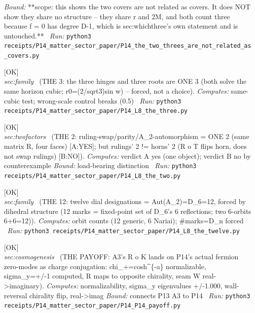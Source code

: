 \begin{description}
 \emph{Bound:} **scope: this shows the two covers are not related as covers. It does NOT show they share no structure -- they share r and 2M, and both count three because f = 0 has degree D-1, which is sec:whichthree's own statement and is untouched.**
\ \emph{Run:} \texttt{python3 receipts/P14\_matter\_sector\_paper/P14\_the\_two\_threes\_are\_not\_related\_as\_covers.py}
\item[\label{rcpt:P14_L8_the_three}\texttt{P14\_L8\_the\_three}]\hfill\textsf{[OK]}\\
\textit{sec:family} \ (THE 3: the three hinges and three roots are ONE 3 (both solve the same horizon cubic; r0=(2/sqrt3)sin w) -- forced, not a choice). 
\emph{Computes:} same-cubic test; wrong-scale control breaks (0.5)
\ \emph{Run:} \texttt{python3 receipts/P14\_matter\_sector\_paper/P14\_L8\_the\_three.py}
\item[\label{rcpt:P14_L8_the_two}\texttt{P14\_L8\_the\_two}]\hfill\textsf{[OK]}\\
\textit{sec:twofactors} \ (THE 2: ruling-swap/parity/A\_2-automorphism = ONE 2 (same matrix R, four faces) [A:YES]; but rulings' 2 != horns' 2 (R o T flips horn, does not swap rulings) [B:NO]). 
\emph{Computes:} verdict A yes (one object); verdict B no by counterexample
 \emph{Bound:} load-bearing distinction
\ \emph{Run:} \texttt{python3 receipts/P14\_matter\_sector\_paper/P14\_L8\_the\_two.py}
\item[\label{rcpt:P14_L8_the_twelve}\texttt{P14\_L8\_the\_twelve}]\hfill\textsf{[OK]}\\
\textit{sec:family} \ (THE 12: twelve dial designations = \textbar{}Aut(A\_2)\textbar{}=\textbar{}D\_6\textbar{}=12, forced by dihedral structure (12 marks = fixed-point set of D\_6's 6 reflections; two 6-orbits 6+6=12)). 
\emph{Computes:} orbit counts (12 generic, 6 Nariai); \#marks=\textbar{}D\_n\textbar{} forced
\ \emph{Run:} \texttt{python3 receipts/P14\_matter\_sector\_paper/P14\_L8\_the\_twelve.py}
\item[\label{rcpt:P14_P14_payoff}\texttt{P14\_P14\_payoff}]\hfill\textsf{[OK]}\\
\textit{sec:cosmogenesis} \ (THE PAYOFF: A3's R o K lands on P14's actual fermion zero-modes as charge conjugation: chi\_+=cosh\textasciicircum{}\{-a\} normalizable, sigma\_y=+/-1 computed, R maps to opposite chirality, seam W real->imaginary). 
\emph{Computes:} normalizability, sigma\_y eigenvalues +/-1.000, wall-reversal chirality flip, real->imag
 \emph{Bound:} connects P13 A3 to P14
\ \emph{Run:} \texttt{python3 receipts/P14\_matter\_sector\_paper/P14\_P14\_payoff.py}

\end{description}

